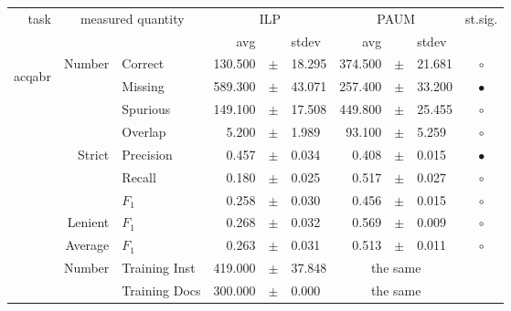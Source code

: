 \begin{longtable}{|r|r|l||rcl|rcl|c|}
\hline
\multirow{2}{*}{task} & \multicolumn{2}{|c||}{\multirow{2}{*}{measured quantity}} & \multicolumn{3}{|c|}{ILP} & \multicolumn{3}{|c|}{PAUM} & \multirow{2}{*}{st.sig.}\\
\cline{4-9}
  & \multicolumn{2}{|c||}{} &  avg  &    &  stdev  &  avg  &    &  stdev  & \\
\hline
\endhead
\hline
\hline
\multirow{11}{*}{\begin{sideways}acqabr\end{sideways} }
             & \multirow{4}{*}{    Number} &         Correct &     130.500 &  $\pm$  &      18.295 &     374.500 &  $\pm$  &      21.681 & $\circ$ \\
\cline{3-10} &                             &         Missing &     589.300 &  $\pm$  &      43.071 &     257.400 &  $\pm$  &      33.200 & $\bullet$ \\
\cline{3-10} &                             &        Spurious &     149.100 &  $\pm$  &      17.508 &     449.800 &  $\pm$  &      25.455 & $\circ$ \\
\cline{3-10} &                             &         Overlap &       5.200 &  $\pm$  &       1.989 &      93.100 &  $\pm$  &       5.259 & $\circ$ \\
\cline{2-10} & \multirow{3}{*}{    Strict} &       Precision &       0.457 &  $\pm$  &       0.034 &       0.408 &  $\pm$  &       0.015 & $\bullet$ \\
\cline{3-10} &                             &          Recall &       0.180 &  $\pm$  &       0.025 &       0.517 &  $\pm$  &       0.027 & $\circ$ \\
\cline{3-10} &                             &           $F_1$ &       0.258 &  $\pm$  &       0.030 &       0.456 &  $\pm$  &       0.015 & $\circ$ \\
\cline{2-10} &                     Lenient &           $F_1$ &       0.268 &  $\pm$  &       0.032 &       0.569 &  $\pm$  &       0.009 & $\circ$ \\
\cline{2-10} &                     Average &           $F_1$ &       0.263 &  $\pm$  &       0.031 &       0.513 &  $\pm$  &       0.011 & $\circ$ \\
\cline{2-10} & \multirow{2}{*}{    Number} &   Training Inst &     419.000 &  $\pm$  &      37.848 &    \multicolumn{3}{c|}{the same}         &  \\
\cline{3-10} &                             &   Training Docs &     300.000 &  $\pm$  &       0.000 &    \multicolumn{3}{c|}{the same}         &  \\

\end{longtable}
